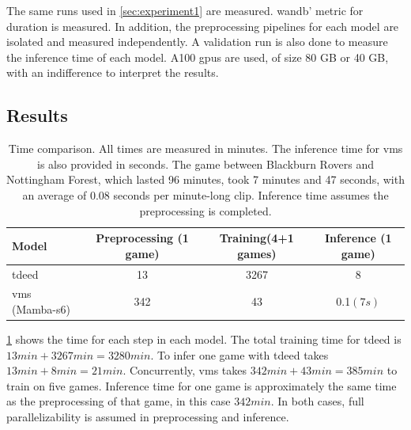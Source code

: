 The same runs used in \autoref{sec:experiment1} are measured. \acrlong{wandb}' metric for duration is measured. In addition, the preprocessing pipelines for each model are isolated and measured independently. A validation run is also done to measure the inference time of each model. A100 \acrshort{gpu}s are used, of size 80 GB or 40 GB, with an indifference to interpret the results. 

\subsection{Results}
\label{ssec:ex2_result}

\begin{table}
    \centering
    \begin{tabular}{lccc}
        \toprule 
        Model & Preprocessing (1 game)  & Training(4+1 games) & Inference (1 game) \\
        \midrule
        \acrshort{tdeed} & 13 & 3267 & 8\\
        \acrshort{vms} (Mamba-\acrshort{s6}) & 342 & 43 & 0.1$(7s)$ \\
        \bottomrule
    \end{tabular}
    \caption{Time comparison. All times are measured in minutes. The inference time for \acrshort{vms} is also provided in seconds. The game between Blackburn Rovers and Nottingham Forest, which lasted 96 minutes, took 7 minutes and 47 seconds, with an average of 0.08 seconds per minute-long clip. Inference time assumes the preprocessing is completed.}
    \label{tab:results_ex2}
\end{table}

\cref{tab:results_ex2} shows the time for each step in each model. The total training time for \acrshort{tdeed} is \(13min+3267min= 3280min\). To infer one game with \acrshort{tdeed} takes \(13min + 8min = 21min \). Concurrently, \acrshort{vms} takes \(342min+43min=385min\) to train on five games. Inference time for one game is approximately the same time as the preprocessing of that game, in this case \(342min\). In both cases, full parallelizability is assumed in preprocessing and inference. 

